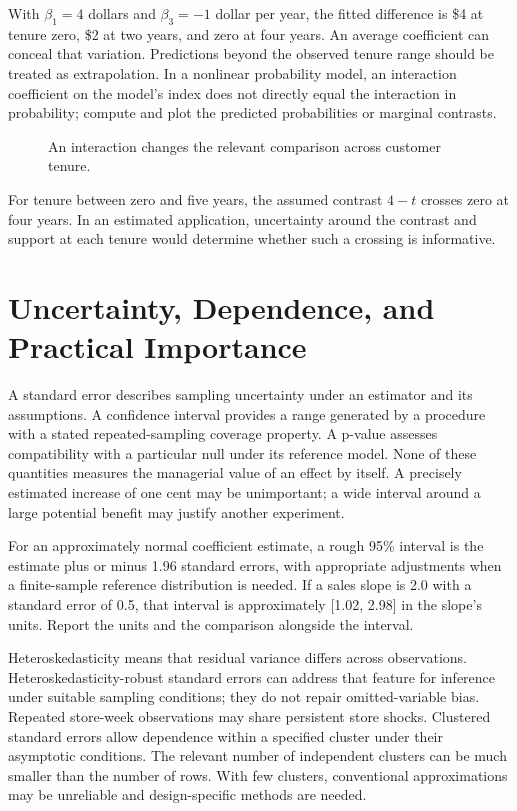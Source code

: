 With \(\beta_1=4\) dollars and \(\beta_3=-1\) dollar per year, the
fitted difference is \$4 at tenure zero, \$2 at two years, and zero at
four years. An average coefficient can conceal that variation.
Predictions beyond the observed tenure range should be treated as
extrapolation. In a nonlinear probability model, an interaction
coefficient on the model's index does not directly equal the interaction
in probability; compute and plot the predicted probabilities or marginal
contrasts.

\begin{figure}[htbp]
\centering

\caption{An interaction changes the relevant comparison across customer tenure.}\label{fig:M03_interaction}
\end{figure}

For tenure between zero and five years, the assumed contrast \(4-t\)
crosses zero at four years. In an estimated application, uncertainty
around the contrast and support at each tenure would determine whether
such a crossing is informative.

\hypertarget{M03-uncertainty-dependence-and-practical-importance}{%
\section{Uncertainty, Dependence, and Practical
Importance}\label{M03-uncertainty-dependence-and-practical-importance}}

\noindent A standard error describes sampling uncertainty under an estimator and
its assumptions. A confidence interval provides a range generated by a
procedure with a stated repeated-sampling coverage property. A p-value
assesses compatibility with a particular null under its reference model.
None of these quantities measures the managerial value of an effect by
itself. A precisely estimated increase of one cent may be unimportant; a
wide interval around a large potential benefit may justify another
experiment.

For an approximately normal coefficient estimate, a rough 95\% interval
is the estimate plus or minus 1.96 standard errors, with appropriate
adjustments when a finite-sample reference distribution is needed. If a
sales slope is 2.0 with a standard error of 0.5, that interval is
approximately {[}1.02, 2.98{]} in the slope's units. Report the units
and the comparison alongside the interval.

Heteroskedasticity means that residual variance differs across
observations. Heteroskedasticity-robust standard errors can address that
feature for inference under suitable sampling conditions; they do not
repair omitted-variable bias. Repeated store-week observations may share
persistent store shocks. Clustered standard errors allow dependence
within a specified cluster under their asymptotic conditions. The
relevant number of independent clusters can be much smaller than the
number of rows. With few clusters, conventional approximations may be
unreliable and design-specific methods are needed.

